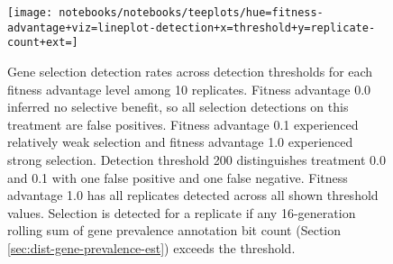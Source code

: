 \begin{figure}
  \centering
  \texttt{[image: notebooks/notebooks/teeplots/hue=fitness-advantage+viz=lineplot-detection+x=threshold+y=replicate-count+ext=]}
  \caption{
    Gene selection detection rates across detection thresholds for each fitness advantage level among 10 replicates.
    Fitness advantage 0.0 inferred no selective benefit, so all selection detections on this treatment are false positives.
    Fitness advantage 0.1 experienced relatively weak selection and fitness advantage 1.0 experienced strong selection.
    Detection threshold 200 distinguishes treatment 0.0 and 0.1 with one false positive and one false negative.
    Fitness advantage 1.0 has all replicates detected across all shown threshold values.
    Selection is detected for a replicate if any 16-generation rolling sum of gene prevalence annotation bit count (Section \ref{sec:dist-gene-prevalence-est}) exceeds the threshold.
  }
  \label{fig:selection-sensitivity-specificity}
\end{figure}
